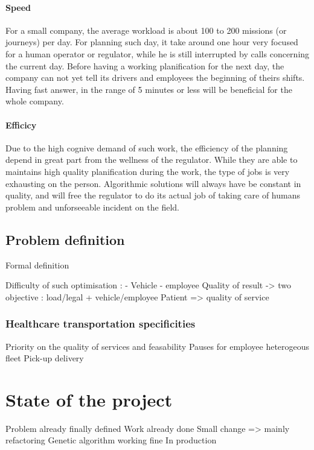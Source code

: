 \documentclass[12pt]{memoir}
\begin{document}
\paragraph{Speed} %
\label{par:Speed}
For a small company, the average workload is about 100 to 200 missions (or journeys)
per day. For planning such day, it take around one hour very focused for a human
operator or regulator, while he is still interrupted by calls concerning the current
day. Before having a working planification for the next day, the company can not yet
tell its drivers and employees the beginning of theirs shifts. Having fast answer,
in the range of 5 minutes or less will be beneficial for the whole company.
\paragraph{Efficicy} %
\label{par:Efficicy}
Due to the high cognive demand of such work, the efficiency of the planning depend
in great part from the wellness of the regulator. While they are able to maintains
high quality planification during the work, the type of jobs is very exhausting on
the person. Algorithmic solutions will always have be constant in quality, and will
free the regulator to do its actual job of taking care of humans problem and
unforseeable incident on the field.


\subsection{Problem definition}
Formal definition

Difficulty of such optimisation : - Vehicle
- employee
Quality of result
-> two objective : load/legal + vehicle/employee
Patient => quality of service

\subsubsection{Healthcare transportation specificities}
\label{sub:Healthcare transportation specificities}
Priority on the quality of services and feasability
Pauses for employee
heterogeous fleet
Pick-up delivery


\section{State of the project}
Problem already finally defined 
Work already done
Small change => mainly refactoring
Genetic algorithm working fine 
In production
\end{document}
